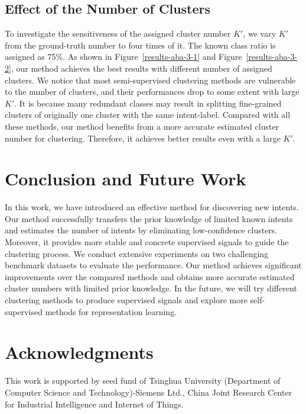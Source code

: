 \documentclass[letterpaper]{article} \usepackage{aaai21}  \usepackage{times}  \usepackage{helvet} \usepackage{courier}  \usepackage[hyphens]{url}  \usepackage{graphicx} \urlstyle{rm} \def\UrlFont{\rm}  \usepackage{natbib}  \usepackage{caption} \frenchspacing  \setlength{\pdfpagewidth}{8.5in}  \setlength{\pdfpageheight}{11in}  \usepackage{amsmath}
\begin{document}
	\subsection{Effect of the Number of Clusters}
	To investigate the sensitiveness of the assigned cluster number $K'$, we vary $K'$ from the ground-truth number to four times of it. The known class ratio is assigned as 75\%. As shown in Figure~\ref{results-aba-3-1} and Figure~\ref{results-aba-3-2}, our method achieves the best results with different number of assigned clusters. We notice that most semi-supervised clustering methods are vulnerable to the number of clusters, and their performances drop to some extent with large  $K'$. It is because many redundant classes may result in splitting fine-grained clusters of originally one cluster with the same intent-label. Compared with all these methods, our method benefits from a more accurate estimated cluster number for clustering. Therefore, it achieves better results even with a large  $K'$. 

	
	
	\section{Conclusion and Future Work}
	In this work, we have introduced an effective method for discovering new intents. Our method successfully transfers the prior knowledge of limited known intents and estimates the number of intents by eliminating low-confidence clusters. Moreover, it provides more stable and concrete supervised signals to guide the clustering process. We conduct extensive experiments on two challenging benchmark datasets to evaluate the performance. Our method achieves significant improvements over the compared methods and obtains more accurate estimated cluster numbers with limited prior knowledge. In the future, we will try different clustering methods to produce supervised signals and explore more self-supervised methods for representation learning.
	
	
	\section{Acknowledgments}
	This work is supported by seed fund of Tsinghua University (Department of Computer Science and Technology)-Siemens Ltd., China Joint Research Center for Industrial Intelligence and Internet of Things. 
	
\end{document}
